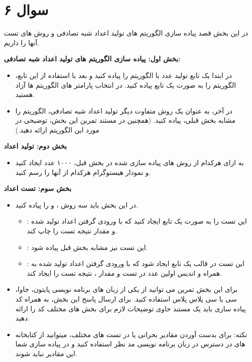 \section*{سوال ۶}

در این بخش قصد پیاده سازی الگوریتم های تولید اعداد شبه تصادفی و روش های تست آنها را داریم.

\textbf{بخش اول: پیاده سازی الگوریتم های تولید اعداد شبه تصادفی:}
\begin{itemize}
	\item در ابتدا یک تابع تولید عدد با الگوریتم  را پیاده کنید و بعد با استفاده از این تابع، الگوریتم  را به صورت یک تابع پیاده کنید. در انتخاب پارامتر های الگوریتم ها آزاد هستید.
	\item در آخر، به عنوان یک روش متفاوت دیگر تولید اعداد شبه تصادفی، الگوریتم  را مشابه بخش قبلی، پیاده کنید. (همچنین در مستند تمرین این بخش، توضیحی در مورد این الگوریتم ارائه دهید.)
\end{itemize}

\textbf{بخش دوم: تولید اعداد}
\begin{itemize}
	\item به ازای هرکدام از روش های پیاده سازی شده در بخش قبل، ۱۰۰۰ عدد ایجاد کنید و نمودار هیستوگرام هرکدام از آنها را رسم کنید.
\end{itemize}

\textbf{بخش سوم: تست اعداد}
\begin{itemize}
	\item در این بخش باید سه روش ،  و  را پیاده کنید.
	\begin{itemize}
		\item {}: این تست را به صورت یک تابع ایجاد کنید که با ورودی گرفتن اعداد تولید شده و مقدار  نتیجه تست را چاپ کند.
		\item {}: این تست نیز مشابه بخش قبل پیاده شود.
		\item {}: این تست در قالب یک تابع ایجاد شود که با ورودی گرفتن اعداد تولید شده به همراه  و اندیس اولین عدد در تست و مقدار ، نتیجه تست را ایجاد کند.
	\end{itemize}
	\item برای این بخش تمرین می توانید از یکی از زبان های برنامه نویسی پایتون، جاوا، سی یا سی پلاس پلاس استفاده کنید. برای ارسال پاسخ این بخش، به همراه کد پیاده سازی باید یک مستند حاوی توضیحات لازم برای بخش های مختلف کد را ارائه دهید.
	\item نکته: برای بدست آوردن مقادیر بحرانی یا  در تست های مختلف، میتوانید از کتابخانه های در دسترس در زبان برنامه نویسی مد نظر استفاده کنید و در پیاده سازی شما این مقادیر نباید  شوند.
\end{itemize}